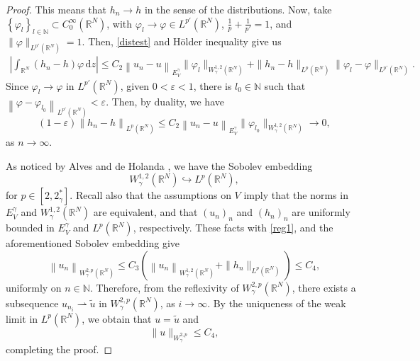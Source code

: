 \documentclass[12pt]{amsart}
\newcommand{\R}{\mathbb{R}}
\begin{document}
\begin{proof}
	 This means that $h_n \rightarrow h$ in the sense of the distributions.	Now, take $\left\{\varphi_l\right\}_{l\in\mathbb{N}} \subset C_0^{\infty}\left(\mathbb{R}^N\right)$, with $\varphi_l \rightarrow \varphi \in L^{p'}(\R^N)$, $\frac{1}{p} + \frac{1}{p'}=1$, and $\|\varphi\|_{L^{p'}(\R^N)}=1$. Then, \eqref{distest} and Hölder inequality give us
	\begin{align*}
		\left|\int_{\R^N} \left(h_n-h\right) \varphi \, \mathrm{d}z \right| 
		\leq  C_2\left\|u_n-u\right\|_{E_V^\gamma} \|\varphi_l \|_{W_\gamma^{1, 2}(\R^N)} + \|h_n-h\|_{L^p(\R^N)}\|\varphi_l - \varphi\|_{L^{p'}(\R^N)} .
	\end{align*}
	Since $\varphi_l \rightarrow \varphi$ in $L^{p'}(\R^N)$, given $0<\varepsilon<1$, there is $l_0 \in \mathbb{N}$ such that $\left\|\varphi - \varphi_{l_0}\right\|_{L^{p'}(\R^N)}<\varepsilon$. Then, by duality, we have
	$$
	(1-\varepsilon)\left\|h_n-h\right\|_{L^p(\R^N)} \leq C_2\left\|u_n-u\right\|_{E_V^\gamma} \|\varphi_{l_0} \|_{W_\gamma^{1, 2}(\R^N)} \rightarrow 0 ,
	$$
    as $n \rightarrow \infty$.


    As noticed by Alves and de Holanda \cite{Alves-Angelo}, we have the Sobolev embedding
    $$W_\gamma^{1, 2}(\R^N) \hookrightarrow L^p(\R^N),$$
    for $p\in[2,2_\gamma^*]$. Recall also that the assumptions on $V$ imply that the norms in $E_V^\gamma$ and $W_\gamma^{1, 2}(\R^N)$ are equivalent, and that $(u_n)_n$ and $(h_n)_n$ are uniformly bounded in $E_V^\gamma$ and $L^p(\R^N)$, respectively. These facts with \eqref{reg1}, and the aforementioned Sobolev embedding give
	\begin{equation}\label{reg2}
		\left\|u_n\right\|_{W_\gamma^{2, p}(\R^N)} \leq C_3\left( \left\|u_n \right\|_{W_\gamma^{1, 2}(\R^N)} +  \|h_n\|_{L^p(\R^N)} \right) \leq C_4,
	\end{equation}
	uniformly on $n\in\mathbb{N}$. Therefore, from the reflexivity of $W_\gamma^{2, p}(\R^N)$, there exists a subsequence $u_{n_i} \rightharpoonup \tilde{u}$ in $W_\gamma^{2, p}(\R^N)$, as $i\rightarrow \infty$. By the uniqueness of the weak limit in  $L^p(\R^N)$, we obtain that $u=\tilde{u}$ and 
	\begin{equation*}
		\|u\|_{W_\gamma^{ 2,p}} \leq  C_4,
	\end{equation*}
    completing the proof.
\end{proof}
\end{document}
